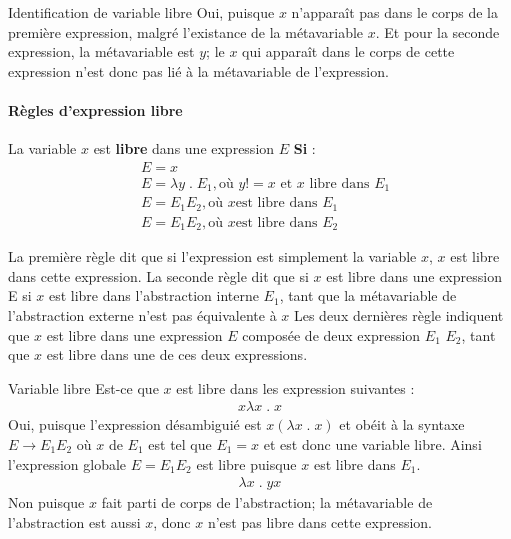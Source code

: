 \documentclass{report}
\begin{document}
\begin{multicols*}{3}
\begin{EExample}{Identification de variable libre}{}
    Oui, puisque $x$ n'apparaît pas dans le corps de la première 
    expression, malgré l'existance de la métavariable $x$. 
    Et pour la seconde expression, la métavariable est $y$; 
    le $x$  qui apparaît dans le corps de cette expression 
    n'est donc pas lié à la métavariable de l'expression.  
  \end{EExample}

    \paragraph{Règles d'expression libre}
    La variable $x$ est \textbf{libre} dans 
    une expression $E$ \textbf{Si} :    
    \begin{align*}
      & E = x \\
      & E = \lambda y \; . \; E_1, \text{où } y!= x \text{ et } x 
      \text{  libre dans } E_1 \\
      & E = E_1 E_2, \text{où } x  \text{est libre dans } E_1 \\
      & E = E_1 E_2, \text{où } x  \text{est libre dans } E_2
    \end{align*}

    La première règle dit que si l'expression est simplement la 
    variable $x$, $x$ est libre dans cette expression. 
    La seconde règle dit que si $x$ est libre dans une expression 
    E si $x$ est libre dans l'abstraction interne $E_1$, 
    tant que la métavariable 
    de l'abstraction externe n'est pas équivalente à $x$
    Les deux dernières règle indiquent que $x$ est libre dans une 
    expression $E$ composée de deux expression $E_1$ $E_2$, tant 
    que $x$ est libre dans une de ces deux expressions.


    \begin{EExample}{Variable libre}{}
        Est-ce que $x$ est libre dans les expression suivantes :
        \begin{align*}
          x \lambda x \; . \; x 
        \end{align*}
      Oui, puisque l'expression désambiguié est 
      $x (\lambda x \; . \; x)$ et obéit à la syntaxe 
      $E \rightarrow E_1 E_2$  où $x$ de $E_1$ est tel que 
      $E_1 = x$ et est donc une variable libre. Ainsi 
      l'expression globale $E = E_1 E_2$ est libre puisque 
      $x$ est libre dans $E_1$. 
        \begin{align*}
          \lambda x \; . \; y x
        \end{align*}
      Non puisque $x$ fait parti de corps de l'abstraction; 
      la métavariable de l'abstraction est aussi $x$, donc $x$ n'est pas 
      libre dans cette expression.
    \end{EExample}


\end{multicols*}
\end{document}
